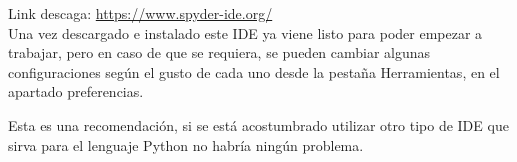 Link descaga: \url{https://www.spyder-ide.org/} \\

Una vez descargado e instalado este IDE ya viene listo para poder empezar a trabajar, pero en caso de que se requiera, se pueden cambiar algunas configuraciones según el gusto de cada uno desde la pestaña Herramientas, en el apartado preferencias.\\


Esta es una recomendación, si se está acostumbrado utilizar otro tipo de IDE que sirva para el lenguaje Python no habría ningún problema.\\

